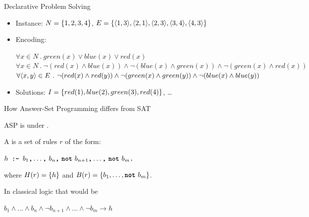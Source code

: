\documentclass{beamer}
\begin{document}
\begin{frame}{Declarative Problem Solving}
\begin{example}
\begin{itemize}
			
				
			\onslide<+->
			
			\item Instance:
				{\scriptsize$N = \left\{{1,2,3,4}\right\}$, $E = \left\{{\langle {1,3} \rangle, \langle {2,1} \rangle, \langle {2,3} \rangle, \langle {3,4} \rangle, \langle {4,3} \rangle}\right\}$}
			
			\onslide<+->
			
			\item Encoding:
				
				{\scriptsize
				$\forall x \in N\ .\ green(x) \vee blue(x) \vee red(x)$\\
				$\forall x \in N\ .\ \neg(red(x) \wedge blue(x)) \wedge \neg(blue(x) \wedge green(x)) \wedge  \neg(green(x) \wedge red(x))$\\
				$\forall \langle {x,y} \rangle \in E\ .\ \neg (red(x) \wedge red(y)) \wedge \neg (green(x) \wedge green(y)) \wedge \neg (blue(x) \wedge blue(y))$\\
				}
			
			\onslide<+->
			
			\item Solutions: {\scriptsize$I = \left\{{red(1), blue(2), green(3), red(4)}\right\}$}, \ldots
			
		\end{itemize}
		
	\end{example}
	
	
\end{frame}

\begin{frame}{How Answer-Set Programming differs from SAT}
	\onslide<+->
	
	ASP is  under .
	
	\onslide<+->
	
	\begin{definition}
		A  is a set of rules $r$ of the form:
		\begin{center}
			$h \code{ :- } b_1 \code{,} \ldots \code{,}\ b_n \code{,}\ \code{not}\ b_{n+1} \code{,} \ldots \code{,}\ \code{not}\ b_m \code{.}$
		\end{center}
		where $H\mathrm{(}{r}\mathrm{)} = \left\{{h}\right\}$ and $\body{r} = \set{b_1, \ldots, \code{not}\ b_m}$.
	\end{definition}
	
	In classical logic that would be
	\begin{center}
		$b_1 \wedge \ldots \wedge b_n \wedge \neg b_{n+1} \wedge \ldots \wedge \neg b_m \rightarrow h$
	\end{center}
	
\end{frame}
\end{document}

